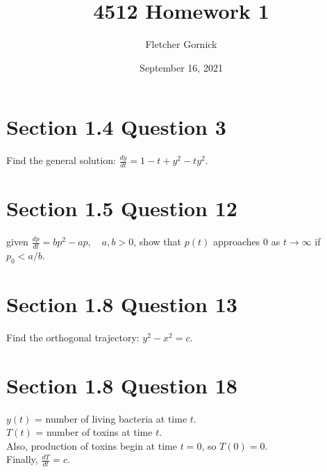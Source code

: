 \documentclass[11pt]{article}
\title{4512 Homework 1}
\author{Fletcher Gornick}
\date{September 16, 2021}
\begin{document}
 \maketitle 

 \section*{Section 1.4 Question 3}
 Find the general solution: $\frac{dy}{dt} = 1 - t + y^2 - ty^2$.

 \section*{Section 1.5 Question 12}
 given $\frac{dp}{dt} = bp^2 - ap, \quad a,b > 0$, show that 
 $p(t)$ approaches $0$ as $t \rightarrow \infty$ if $p_0 < a/b$.

 \section*{Section 1.8 Question 13}
 Find the orthogonal trajectory: $y^2 - x^2 = c$.

 \section*{Section 1.8 Question 18}
 $y(t)$ = number of living bacteria at time $t$. \\

 $T(t)$ = number of toxins at time $t$. \\
 Also, production of toxins begin at time $t=0$, so $T(0) = 0$. \\

 Finally, $\frac{dT}{dt} = c$.
\end{document}
